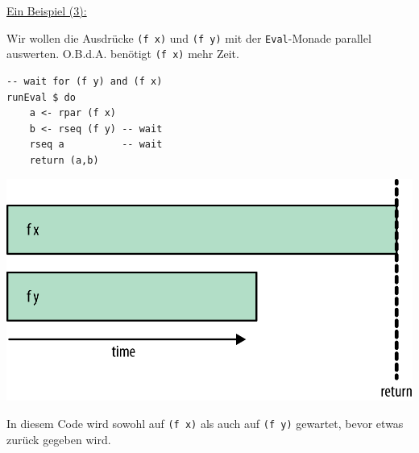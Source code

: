 \documentclass{beamer}
\begin{document}
\begin{frame}[fragile]
\underline{Ein Beispiel (3):}\smallskip

Wir wollen die Ausdrücke \texttt{(f x)} und \texttt{(f y)} mit der \texttt{Eval}-Monade parallel auswerten. O.B.d.A. benötigt \texttt{(f x)} mehr Zeit.

\begin{multicols}{2}
\begin{verbatim}
-- wait for (f y) and (f x)
runEval $ do
    a <- rpar (f x)
    b <- rseq (f y) -- wait
    rseq a          -- wait
    return (a,b)
\end{verbatim}
\columnbreak
\pause
\includegraphics[scale=0.7]{evalmonad_03.png}
\end{multicols}
\pause

In diesem Code wird sowohl auf \texttt{(f x)} als auch auf \texttt{(f y)} gewartet, 
bevor etwas zurück gegeben wird.
\end{frame}


\end{document}
